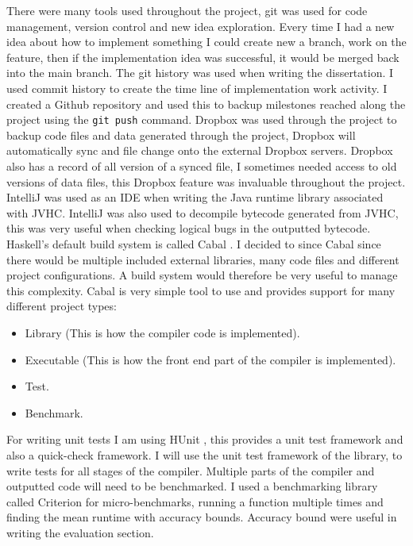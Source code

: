 \documentclass[float=false, crop=false]{standalone}
\begin{document}
There were many tools used throughout the project, git was used for 
code management, version control and new idea exploration. Every time
I had a new idea about how to implement something I could create new a 
branch, work on the feature, then if the implementation idea was successful, 
it would be merged back into the main branch. 
The git history was used when writing the dissertation.
I used commit history to create the time line
of implementation work activity. 
I created a Github repository and used this to backup milestones reached 
along the project using the \verb|git push| command.
Dropbox was used through the project to backup code files and data generated 
through the project, Dropbox will automatically sync and file change
onto the external Dropbox servers. Dropbox also has a record of all
version of a synced file, I sometimes needed access to old versions
of data files, this Dropbox feature was invaluable throughout the project.
IntelliJ \cite{intellij-ide} was used as an IDE when writing the Java
runtime library associated with JVHC. IntelliJ was also used to decompile
bytecode generated from JVHC, this was very useful when checking logical
bugs in the outputted bytecode.
Haskell's default build system is called Cabal \cite{cabal}. I 
decided to since Cabal since there would be multiple included external libraries,
many code files and different project configurations.
A build system would therefore be very useful to manage this
complexity. Cabal is very simple tool to use and provides support
for many different project types:
  \begin{itemize}
    \item Library (This is how the compiler code is implemented).

    \item Executable (This is how the front end part of the compiler is 
      implemented).

    \item Test.

    \item Benchmark.
  \end{itemize}
For writing unit tests I am using HUnit \cite{hunit},
this provides a unit test framework and also a quick-check framework. 
I will use the unit test framework of the library, 
to write tests for all stages of the compiler.
Multiple parts of the compiler and outputted code will
need to be benchmarked. I used a benchmarking library called
Criterion \cite{criterion} for micro-benchmarks, running a function
multiple times and finding the mean runtime with accuracy bounds.
Accuracy bound were useful in writing the evaluation section.
\end{document}
